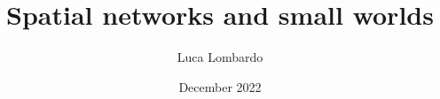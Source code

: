 \documentclass[12pt]{article}
\title{Spatial networks and small worlds}
\author{Luca Lombardo}
\date{December 2022}
\begin{document}
\maketitle

\begin{abstract}
    \noindent \lipsum[1]
\end{abstract}

\tableofcontents
\clearpage








\clearpage


\nocite{*}
\end{document}
